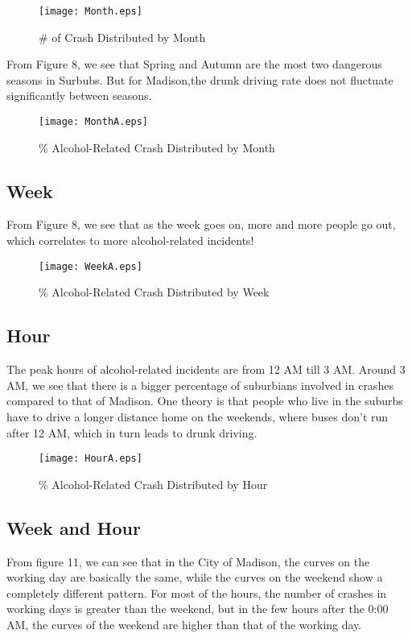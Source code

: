 \documentclass[10pt]{article}
\begin{document}
\begin{figure}[H]
\flushleft
\texttt{[image: Month.eps]}
\caption{\# of Crash Distributed by Month}
\label{7}
\end{figure}

\newpage
From Figure 8, we see that Spring and Autumn are the most two dangerous seasons in Surbubs. But for Madison,the drunk driving rate does not fluctuate significantly between seasons.

\begin{figure}[H]
\flushleft
\texttt{[image: MonthA.eps]}
\caption{\% Alcohol-Related Crash Distributed by Month}
\label{8}
\end{figure}

\newpage
\subsection{Week}
From Figure 8, we see that as the week goes on, more and more people go out, which correlates to more alcohol-related incidents!
\begin{figure}[H]
\flushleft
\texttt{[image: WeekA.eps]}
\caption{\% Alcohol-Related Crash Distributed by Week}
\label{9}
\end{figure}

\newpage
\subsection{Hour}
The peak hours of alcohol-related incidents are from 12 AM till 3 AM. Around 3 AM, we see that there is a bigger percentage of suburbians involved in crashes compared to that of Madison. One theory is that people who live in the suburbs have to drive a longer distance home on the weekends, where buses don't run after 12 AM, which in turn leads to drunk driving.
\begin{figure}[H]
\flushleft
\texttt{[image: HourA.eps]}
\caption{\% Alcohol-Related Crash Distributed by Hour}
\label{10}
\end{figure}

\newpage
\subsection{Week and Hour}
From figure 11, we can see that in the City of Madison, the curves on the working day are basically the same, while the curves on the weekend show a completely different pattern. For most of the hours, the number of crashes in working days is greater than the weekend, but in the few hours after the 0:00 AM, the curves of the weekend are higher than that of the working day.
\end{document}
